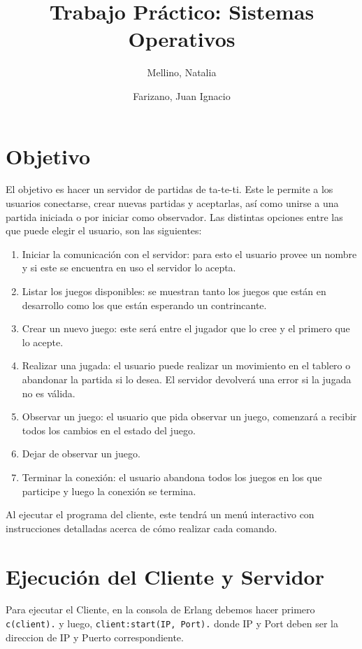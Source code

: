 \documentclass[11pt]{article}
\title{Trabajo Práctico: Sistemas Operativos}
\author{Mellino, Natalia \and Farizano, Juan Ignacio}
\date{}
\begin{document}
\maketitle

\section*{Objetivo}
El objetivo es hacer un servidor de partidas de ta-te-ti. Este le permite a los 
usuarios conectarse, crear nuevas partidas y aceptarlas, así como unirse a una
partida iniciada o por iniciar como observador. Las distintas opciones entre las que
puede elegir el usuario, son las siguientes:

\begin{enumerate}
    \item Iniciar la comunicación con el servidor: para esto el usuario provee un
          nombre y si este se encuentra en uso el servidor lo acepta.
    \item Listar los juegos disponibles: se muestran tanto los juegos que están en
          desarrollo como los que están esperando un contrincante.
    \item Crear un nuevo juego: este será entre el jugador que lo cree y el primero
          que lo acepte.
    \item Realizar una jugada: el usuario puede realizar un movimiento en el 
          tablero o abandonar la partida si lo desea. El servidor devolverá una
          error si la jugada no es válida.
    \item Observar un juego: el usuario que pida observar un juego, comenzará a 
          recibir todos los cambios en el estado del juego.
    \item Dejar de observar un juego.
    \item Terminar la conexión: el usuario abandona todos los juegos en los que 
          participe y luego la conexión se termina.
\end{enumerate}

Al ejecutar el programa del cliente, este tendrá un menú interactivo con instrucciones
detalladas acerca de cómo realizar cada comando.

\section*{Ejecución del Cliente y Servidor}

Para ejecutar el Cliente, en la consola de Erlang debemos hacer primero \texttt{c(client).} y
luego, \texttt{client:start(IP, Port).} donde IP y Port deben ser la direccion de IP y
Puerto correspondiente. \\
\end{document}
